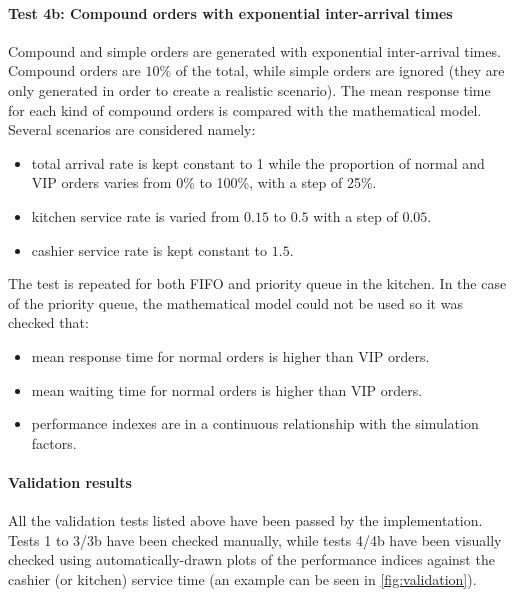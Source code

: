 \paragraph{Test 4b: Compound orders with exponential inter-arrival times}
Compound and simple orders are generated with exponential inter-arrival times.
Compound orders are $10\%$ of the total, while simple orders are ignored (they are
only generated in order to create a realistic scenario). The 
mean response time for each kind of compound orders is compared with the mathematical 
model. Several scenarios are considered namely:
\begin{itemize}
    \item total arrival rate is kept constant to 1 while the proportion of 
        normal and VIP orders varies from 0\% to 100\%, with a step of 25\%.
    \item kitchen service rate is varied from $0.15$ to $0.5$ with a step of $0.05$.
    \item cashier service rate is kept constant to $1.5$.
\end{itemize}
The test is repeated for both FIFO and priority queue in the kitchen. In the case 
of the priority queue, the mathematical model could not be used so it was checked 
that:
\begin{itemize}
    \item mean response time for normal orders is higher than VIP orders.
    \item mean waiting time for normal orders is higher than VIP orders.
    \item performance indexes are in a continuous relationship with the simulation
        factors.
\end{itemize}

\paragraph{Validation results}
All the validation tests listed above have been passed by the implementation.
Tests 1 to 3/3b have been checked manually, while tests 4/4b have been visually 
checked using automatically-drawn plots of the performance indices against the
cashier (or kitchen) service time (an example can be seen in 
\cref{fig:validation}). 


